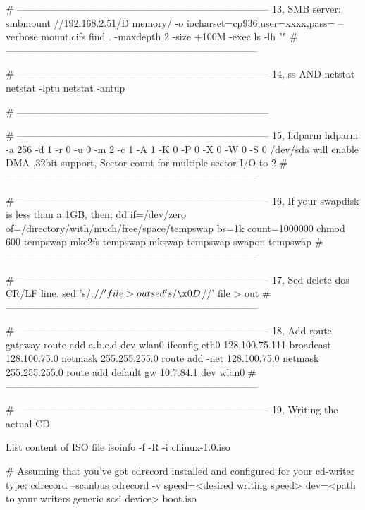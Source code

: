 # -----------------------------------------------------------------------------
13, SMB server:
smbmount //192.168.2.51/D memory/ -o iocharset=cp936,user=xxxx,pass= --verbose
mount.cifs
find . -maxdepth 2 -size +100M -exec ls -lh "{}" \;
# -----------------------------------------------------------------------------

# -----------------------------------------------------------------------------
14, ss AND netstat
netstat -lptu
netstat -antup

# -----------------------------------------------------------------------------


# -----------------------------------------------------------------------------
15, hdparm
hdparm -a 256 -d 1 -r 0 -u 0 -m 2 -c 1 -A 1 -K 0 -P 0 -X 0 -W 0 -S 0 /dev/sda 
will enable DMA ,32bit support, Sector count for multiple sector I/O to 2
# -----------------------------------------------------------------------------

# -----------------------------------------------------------------------------
16,  If your swapdisk is less than a 1GB, then;
dd if=/dev/zero of=/directory/with/much/free/space/tempswap bs=1k count=1000000
chmod 600 tempswap
mke2fs tempswap
mkswap tempswap
swapon tempswap
# -----------------------------------------------------------------------------

# -----------------------------------------------------------------------------
17, Sed delete dos CR/LF line.
sed 's/.$//' file > out 
sed 's/\x0D$//' file > out
# -----------------------------------------------------------------------------

# -----------------------------------------------------------------------------
18, Add route gateway
route add a.b.c.d dev wlan0
ifconfig eth0 128.100.75.111 broadcast 128.100.75.0 netmask 255.255.255.0
route add -net 128.100.75.0 netmask 255.255.255.0
route add default gw 10.7.84.1 dev wlan0
# -----------------------------------------------------------------------------

# -----------------------------------------------------------------------------
19, Writing the actual CD

 List content of ISO file 
isoinfo -f -R -i cflinux-1.0.iso


# Assuming that you've got cdrecord installed and configured for your cd-writer
type:
cdrecord --scanbus
cdrecord -v speed=<desired writing speed> dev=<path to your writers generic scsi device> boot.iso

